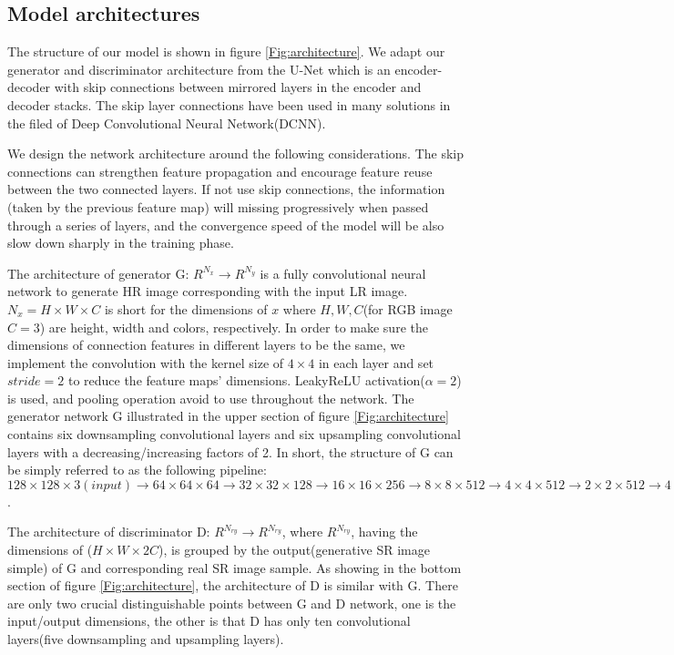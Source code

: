 \documentclass[conference,compsoc]{IEEEtran}
\begin{document}
\subsection{Model architectures}
The structure of our model is shown in figure \ref{Fig:architecture}. We adapt our generator and discriminator architecture from the U-Net\cite{ronneberger2015U-net} which is an encoder-decoder with skip connections between mirrored layers in the encoder and decoder stacks. The skip layer connections have been used in many solutions\cite{ronneberger2015U-net, huang2016Densenet, orhan2017skip, Densenetsemantic} in the filed of Deep Convolutional Neural Network(DCNN).

We design the network architecture around the following considerations. The skip connections can strengthen feature propagation and encourage feature reuse between the two connected layers. If not use skip connections, the information (taken by the previous feature map) will missing progressively when passed through a series of layers, and the convergence speed of the model will be also slow down sharply in the training phase.

The architecture of generator G: $R^{N_x} \rightarrow R^{N_y}$ is a fully convolutional neural network to generate HR image corresponding with the input LR image. $N_x = H\times W \times C$ is short for the dimensions of $x$ where $H,W,C$(for RGB image $C=3$) are height, width and colors, respectively. In order to make sure the dimensions of connection features in different layers to be the same, we implement the convolution with the kernel size of $4\times4$ in each layer and set $stride = 2$  to reduce the feature maps' dimensions. LeakyReLU activation($\alpha = 2$) is used, and pooling operation avoid to use throughout the network. The generator network G illustrated in the upper section of figure \ref{Fig:architecture} contains six downsampling convolutional layers and six upsampling convolutional layers with a decreasing/increasing factors of 2. In short, the structure of G can be simply referred to as the following pipeline: $128\times128\times3(input)\rightarrow 64\times64\times64 \rightarrow 32\times32\times128 \rightarrow 16\times16\times256 \rightarrow 8\times8\times512 \rightarrow 4\times4\times512 \rightarrow 2\times2\times512 \rightarrow 4\times4\times1024 \rightarrow 8\times8\times1024 \rightarrow 16\times16\times512 \rightarrow 32\times32\times256 \rightarrow 64\times64\times128 \rightarrow 128\times128\times3(output)$.

The architecture of discriminator D: $R^{N_{ry}} \rightarrow R^{N_{ry}}$, where $R^{N_{ry}}$, having the dimensions of ($H \times W \times 2C$), is grouped by the output(generative SR image simple) of G and corresponding real SR image sample. As showing in the bottom section of figure \ref{Fig:architecture}, the architecture of D is similar with G. There are only two crucial distinguishable points between G and D network, one is the input/output dimensions, the other is that D has only ten convolutional layers(five downsampling and upsampling layers).
\end{document}
